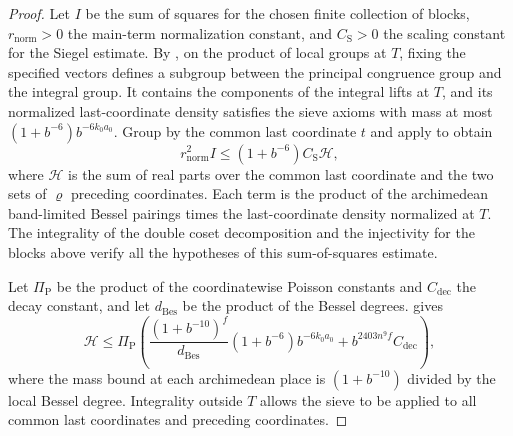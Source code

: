 \begin{proof}
Let $I$ be the sum of squares for the chosen finite collection of blocks, $r_{\mathrm{norm}}>0$ the main-term normalization constant,
and $C_{\mathrm{S}}>0$ the scaling constant for the Siegel estimate.
By , on the product of local groups at $T$, fixing the specified vectors defines a subgroup between the principal congruence group and the integral group.
It contains the components of the integral lifts at $T$, and its normalized last-coordinate density satisfies the sieve axioms
with mass at most $(1+b^{-6})b^{-6k_0a_0}$.
Group by the common last coordinate $t$ and apply  to obtain
\[
 r_{\mathrm{norm}}^2 I
 \le (1+b^{-6}) C_{\mathrm{S}}\mathcal H ,
\]
where $\mathcal H$ is the sum of real parts over the common last coordinate and the two sets of $\varrho$ preceding coordinates.
Each term is the product of the archimedean band-limited Bessel pairings times the last-coordinate density normalized at $T$.
The integrality of the double coset decomposition and the injectivity for the blocks above verify all the hypotheses of this sum-of-squares estimate.

Let $\Pi_{\mathrm P}$ be the product of the coordinatewise Poisson constants and $C_{\mathrm{dec}}$ the decay constant,
and let $d_{\mathrm{Bes}}$ be the product of the Bessel degrees.  gives
\[
 \mathcal H\le \Pi_{\mathrm P}
 \left(\frac{(1+b^{-10})^f}{d_{\mathrm{Bes}}}(1+b^{-6})b^{-6k_0a_0}
          +b^{2403n^9 f}C_{\mathrm{dec}}\right),
\]
where the mass bound at each archimedean place is $(1+b^{-10})$ divided by the local Bessel degree.
Integrality outside $T$ allows the sieve to be applied to all common last coordinates and preceding coordinates.


\end{proof}
